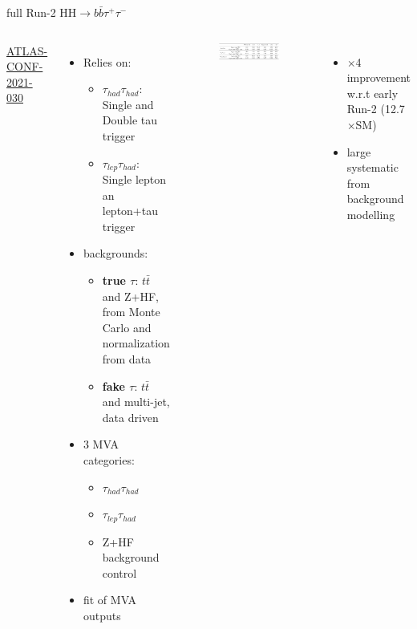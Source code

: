 \begin{frame}{full Run-2 HH$\to b\bar{b} \tau^+\tau^-$}
\begin{columns}
\href{https://atlas.web.cern.ch/Atlas/GROUPS/PHYSICS/CONFNOTES/ATLAS-CONF-2021-030/}{ATLAS-CONF-2021-030}
\begin{itemize}
    \item Relies on:
    \begin{itemize}
        \item $\tau_{had}\tau_{had}$: Single and Double tau trigger
        \item $\tau_{lep}\tau_{had}$: Single lepton an lepton+tau trigger
    \end{itemize}
    \item backgrounds:
    \begin{itemize}
        \item \textbf{true $\tau$}: $t\bar{t}$ and Z+HF, from Monte Carlo and normalization from data
        \item \textbf{fake $\tau$}: $t\bar{t}$ and multi-jet, data driven
    \end{itemize}
    \item 3 MVA categories: 
    \begin{itemize}
        \item $\tau_{had}\tau_{had}$
        \item $\tau_{lep}\tau_{had}$
        \item Z+HF background control
    \end{itemize}
    \item fit of MVA outputs
\end{itemize}


\begin{figure}
    \centering
    \includegraphics[width=1.\textwidth]{BackUp/Part3/Img/tautau_results.png}
\end{figure}

\begin{itemize}
    \item $\times$4 improvement w.r.t early Run-2 (12.7$\times$SM)
    \item large systematic from background modelling
\end{itemize}
\end{columns}
\end{frame}

